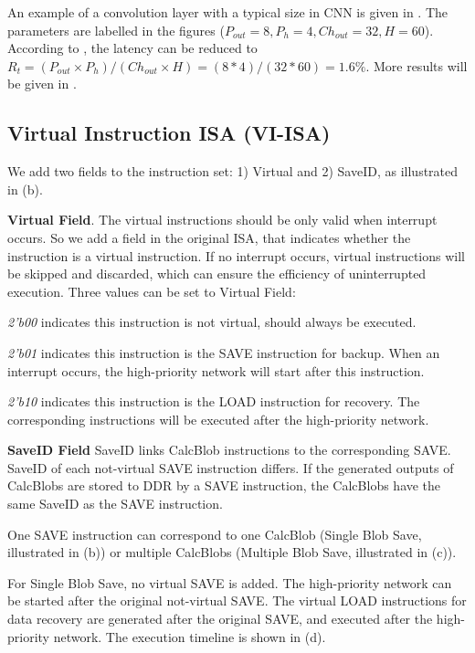 An example of a convolution layer with a typical size in CNN is given in . The parameters are labelled in the figures ($P_{out}=8,P_{h}=4,Ch_{out}=32,H=60$). 
According to , the latency can be reduced to $R_t = (P_{out} \times P_{h}) /( Ch_{out} \times H ) = (8*4)/(32*60) =1.6\%$.
More results will be given in .



\subsection{Virtual Instruction ISA (VI-ISA) }
\label{sec:virtualinstr}

We add two fields to the instruction set: 1) Virtual and 2) SaveID, as illustrated in (b). 

\textbf{ Virtual Field}. The virtual instructions should be only valid when interrupt occurs. So we add a field in the original ISA, that indicates whether the instruction is a virtual instruction. If no interrupt occurs, virtual instructions will be skipped and discarded, which can ensure the efficiency of uninterrupted execution. Three values can be set to Virtual Field:

	\textit{2'b00} indicates this instruction is not virtual, should always be executed.
	
	\textit{2'b01} indicates this instruction is the SAVE instruction for backup. When an interrupt occurs, the high-priority network will start after this instruction.
	
	\textit{2'b10} indicates this instruction is the LOAD instruction for recovery. The corresponding instructions will be executed after the high-priority network.

\textbf{ SaveID Field }
SaveID links CalcBlob instructions to the corresponding SAVE. SaveID of each not-virtual SAVE instruction differs. If the generated outputs of CalcBlobs are stored to DDR by a SAVE instruction, the CalcBlobs have the same SaveID as the SAVE instruction.

One SAVE instruction can correspond to one CalcBlob (Single Blob Save, illustrated in (b)) or multiple CalcBlobs (Multiple Blob Save, illustrated in (c)).

For Single Blob Save, no virtual SAVE is added. The high-priority network can be started after the original not-virtual SAVE. The virtual LOAD instructions for data recovery are generated after the original SAVE, and executed after the high-priority network. The execution timeline is shown in (d).

